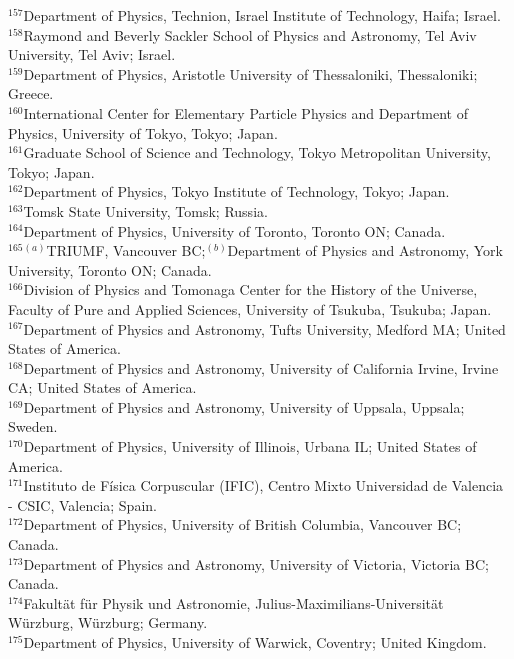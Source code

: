 \begin{flushleft}
$^{157}$Department of Physics, Technion, Israel Institute of Technology, Haifa; Israel.\\
$^{158}$Raymond and Beverly Sackler School of Physics and Astronomy, Tel Aviv University, Tel Aviv; Israel.\\
$^{159}$Department of Physics, Aristotle University of Thessaloniki, Thessaloniki; Greece.\\
$^{160}$International Center for Elementary Particle Physics and Department of Physics, University of Tokyo, Tokyo; Japan.\\
$^{161}$Graduate School of Science and Technology, Tokyo Metropolitan University, Tokyo; Japan.\\
$^{162}$Department of Physics, Tokyo Institute of Technology, Tokyo; Japan.\\
$^{163}$Tomsk State University, Tomsk; Russia.\\
$^{164}$Department of Physics, University of Toronto, Toronto ON; Canada.\\
$^{165}$$^{(a)}$TRIUMF, Vancouver BC;$^{(b)}$Department of Physics and Astronomy, York University, Toronto ON; Canada.\\
$^{166}$Division of Physics and Tomonaga Center for the History of the Universe, Faculty of Pure and Applied Sciences, University of Tsukuba, Tsukuba; Japan.\\
$^{167}$Department of Physics and Astronomy, Tufts University, Medford MA; United States of America.\\
$^{168}$Department of Physics and Astronomy, University of California Irvine, Irvine CA; United States of America.\\
$^{169}$Department of Physics and Astronomy, University of Uppsala, Uppsala; Sweden.\\
$^{170}$Department of Physics, University of Illinois, Urbana IL; United States of America.\\
$^{171}$Instituto de F\'isica Corpuscular (IFIC), Centro Mixto Universidad de Valencia - CSIC, Valencia; Spain.\\
$^{172}$Department of Physics, University of British Columbia, Vancouver BC; Canada.\\
$^{173}$Department of Physics and Astronomy, University of Victoria, Victoria BC; Canada.\\
$^{174}$Fakult\"at f\"ur Physik und Astronomie, Julius-Maximilians-Universit\"at W\"urzburg, W\"urzburg; Germany.\\
$^{175}$Department of Physics, University of Warwick, Coventry; United Kingdom.\\
$$
\end{flushleft}
